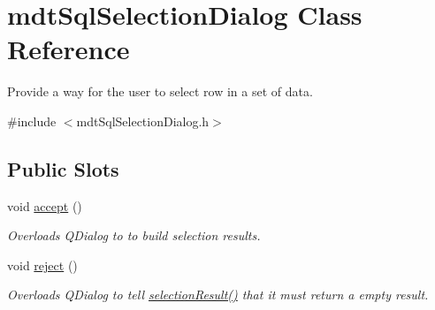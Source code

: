 \hypertarget{classmdt_sql_selection_dialog}{
\section{mdtSqlSelectionDialog Class Reference}
\label{classmdt_sql_selection_dialog}
}


Provide a way for the user to select row in a set of data.  




{\ttfamily \#include $<$mdtSqlSelectionDialog.h$>$}

\subsection*{Public Slots}
\begin{DoxyCompactItemize}
\item 
\hypertarget{classmdt_sql_selection_dialog_af8d08c3192c20d297439afa3a12229c6}{
void \hyperlink{classmdt_sql_selection_dialog_af8d08c3192c20d297439afa3a12229c6}{accept} ()}
\label{classmdt_sql_selection_dialog_af8d08c3192c20d297439afa3a12229c6}

\begin{DoxyCompactList}\small\item\em Overloads QDialog to to build selection results. \end{DoxyCompactList}\item 
\hypertarget{classmdt_sql_selection_dialog_a4277a8f432ee3470039311f9dda9c26d}{
void \hyperlink{classmdt_sql_selection_dialog_a4277a8f432ee3470039311f9dda9c26d}{reject} ()}
\label{classmdt_sql_selection_dialog_a4277a8f432ee3470039311f9dda9c26d}

\begin{DoxyCompactList}\small\item\em Overloads QDialog to tell \hyperlink{classmdt_sql_selection_dialog_a23592c799f3b8945b3f5e72082dc265b}{selectionResult()} that it must return a empty result. \end{DoxyCompactList}\end{DoxyCompactItemize}

